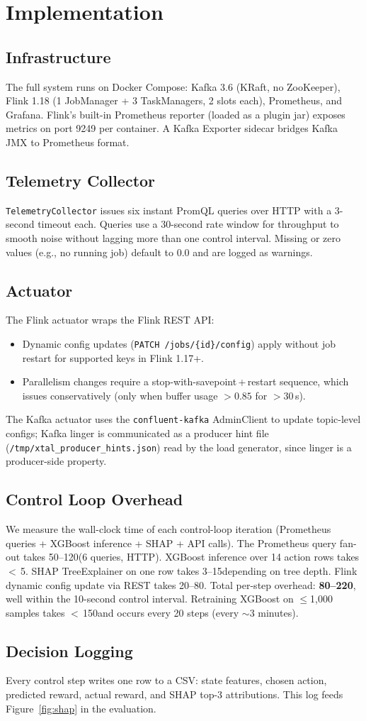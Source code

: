 \section{Implementation}
\label{sec:impl}

\subsection{Infrastructure}
The full system runs on Docker Compose: Kafka 3.6 (KRaft, no ZooKeeper),
Flink 1.18 (1 JobManager + 3 TaskManagers, 2 slots each), Prometheus,
and Grafana.
Flink's built-in Prometheus reporter (loaded as a plugin jar) exposes
metrics on port 9249 per container.
A Kafka Exporter sidecar bridges Kafka JMX to Prometheus format.

\subsection{Telemetry Collector}
\texttt{TelemetryCollector} issues six instant PromQL queries over HTTP
with a 3-second timeout each.
Queries use a 30-second rate window for throughput to smooth noise without
lagging more than one control interval.
Missing or zero values (e.g., no running job) default to 0.0 and are
logged as warnings.

\subsection{Actuator}
The Flink actuator wraps the Flink REST API:
\begin{itemize}
  \item Dynamic config updates (\texttt{PATCH /jobs/\{id\}/config}) apply
    without job restart for supported keys in Flink 1.17+.
  \item Parallelism changes require a stop-with-savepoint\,+\,restart sequence,
    which \xtal issues conservatively (only when buffer usage $>0.85$ for
    $>30$\,s).
\end{itemize}
The Kafka actuator uses the \texttt{confluent-kafka} AdminClient to
update topic-level configs; Kafka linger is communicated as a producer
hint file (\texttt{/tmp/xtal\_producer\_hints.json}) read by the load
generator, since linger is a producer-side property.

\subsection{Control Loop Overhead}
We measure the wall-clock time of each control-loop iteration
(Prometheus queries + XGBoost inference + SHAP + API calls).
The Prometheus query fan-out takes 50--120\ms (6 queries, HTTP).
XGBoost inference over 14 action rows takes $<$\,5\ms.
SHAP TreeExplainer on one row takes 3--15\ms depending on tree depth.
Flink dynamic config update via REST takes 20--80\ms.
Total per-step overhead: \textbf{80--220\ms}, well within the 10-second
control interval. Retraining XGBoost on $\leq$1{,}000 samples takes
$<$\,150\ms and occurs every 20 steps (every $\sim$3 minutes).

\subsection{Decision Logging}
Every control step writes one row to a CSV:
state features, chosen action, predicted reward, actual reward,
and SHAP top-3 attributions.
This log feeds Figure~\ref{fig:shap} in the evaluation.
